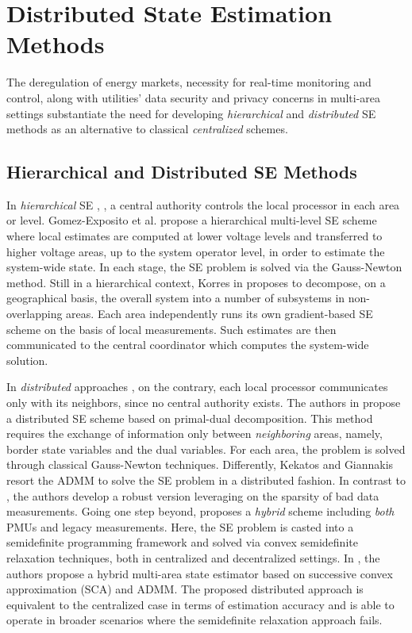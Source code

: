 \documentclass[journal]{IEEEtran}
\begin{document}
\section{Distributed State Estimation Methods}

The deregulation of energy markets, necessity for real-time monitoring and control, along with utilities' data security and privacy concerns in multi-area settings substantiate the need for developing \emph{hierarchical} and \emph{distributed} SE methods as an alternative to classical \emph{centralized} schemes.
 
 
\subsection{Hierarchical and Distributed SE Methods}

In \emph{hierarchical} SE \cite{exposito}, \cite{korres}, a central authority controls the local processor in each area or level. Gomez-Exposito et al. \cite{exposito} propose a hierarchical multi-level SE scheme where local estimates are computed at lower voltage levels and transferred to higher voltage areas, up to the system operator level, in order to estimate the system-wide state. In each stage, the SE problem is solved via the Gauss-Newton method. Still in a hierarchical context, Korres in \cite{korres} proposes to decompose, on a geographical basis, the overall system into a number of subsystems in non-overlapping areas. Each area independently runs its own gradient-based SE scheme on the basis of local measurements. Such estimates are then communicated to the central coordinator which computes the system-wide solution.
 
In \emph{distributed} approaches \cite{minguez, giannakis, haro}, on the contrary, each local processor communicates only with its neighbors, since no central authority exists. The authors in \cite{minguez} propose a distributed SE scheme based on primal-dual decomposition. This method requires the exchange of information only between \emph{neighboring} areas, namely, border state variables and the dual variables. For each area, the problem is solved through classical Gauss-Newton techniques. Differently, Kekatos and Giannakis \cite{giannakis} resort the ADMM to solve the SE problem in a distributed fashion. In contrast to \cite{minguez}, the authors develop a robust version leveraging on the sparsity of bad data measurements. Going one step beyond, \cite{zhu} proposes a \emph{hybrid} scheme including \emph{both} PMUs and legacy measurements. Here, the SE problem is casted into a semidefinite programming framework and solved via convex semidefinite relaxation techniques, both in centralized and decentralized settings. In \cite{haro}, the authors propose a hybrid multi-area state estimator based on successive convex approximation (SCA) and ADMM. The proposed distributed approach is equivalent to the centralized case in terms of estimation accuracy and is able to operate in broader scenarios where the semidefinite relaxation approach fails. 
\end{document}
